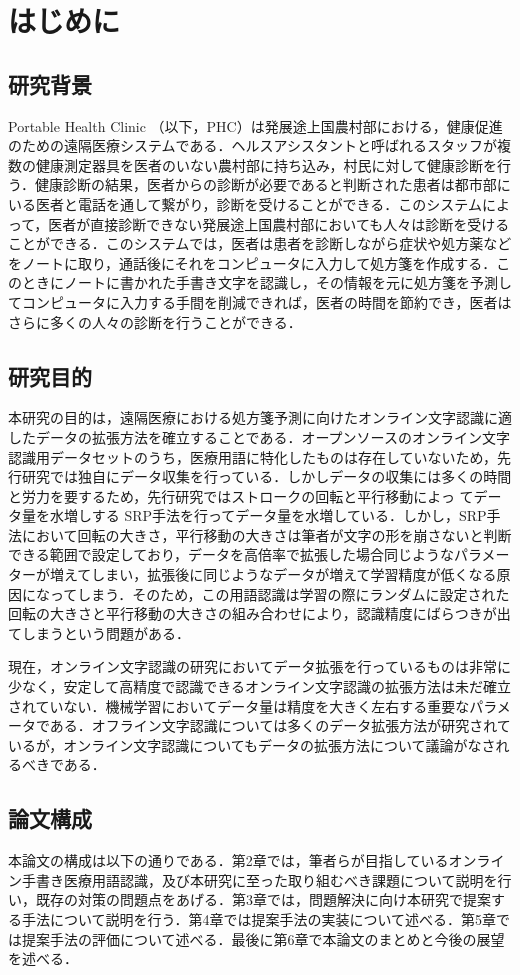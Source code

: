 
\chapter{はじめに}
\label{cha:intro}
\section{研究背景}
\label{sec:background}
Portable Health Clinic （以下，PHC）は発展途上国農村部における，健康促進のための遠隔医療システムである\cite{ahmed15:portable}．ヘルスアシスタントと呼ばれるスタッフが複数の健康測定器具を医者のいない農村部に持ち込み，村民に対して健康診断を行う．健康診断の結果，医者からの診断が必要であると判断された患者は都市部にいる医者と電話を通して繋がり，診断を受けることができる．このシステムによって，医者が直接診断できない発展途上国農村部においても人々は診断を受けることができる．このシステムでは，医者は患者を診断しながら症状や処方薬などをノートに取り，通話後にそれをコンピュータに入力して処方箋を作成する．このときにノートに書かれた手書き文字を認識し，その情報を元に処方箋を予測してコンピュータに入力する手間を削減できれば，医者の時間を節約でき，医者はさらに多くの人々の診断を行うことができる．

\section{研究目的}
本研究の目的は，遠隔医療における処方箋予測に向けたオンライン文字認識に適したデータの拡張方法を確立することである．オープンソースのオンライン文字認識用データセットのうち，医療用語に特化したものは存在していないため，先行研究\cite{takahashi}では独自にデータ収集を行っている．しかしデータの収集には多くの時間と労力を要するため，先行研究ではストロークの回転と平行移動によっ てデータ量を水増しする SRP手法を行ってデータ量を水増している．しかし，SRP手法において回転の大きさ，平行移動の大きさは筆者が文字の形を崩さないと判断できる範囲で設定しており，データを高倍率で拡張した場合同じようなパラメーターが増えてしまい，拡張後に同じようなデータが増えて学習精度が低くなる原因になってしまう．そのため，この用語認識は学習の際にランダムに設定された回転の大きさと平行移動の大きさの組み合わせにより，認識精度にばらつきが出てしまうという問題がある．

現在，オンライン文字認識の研究においてデータ拡張を行っているものは非常に少なく，安定して高精度で認識できるオンライン文字認識の拡張方法は未だ確立されていない．機械学習においてデータ量は精度を大きく左右する重要なパラメータである．オフライン文字認識については多くのデータ拡張方法が研究されているが，オンライン文字認識についてもデータの拡張方法について議論がなされるべきである．


\section{論文構成}
本論文の構成は以下の通りである．第2章では，筆者らが目指しているオンライン手書き医療用語認識，及び本研究に至った取り組むべき課題について説明を行い，既存の対策の問題点をあげる．第3章では，問題解決に向け本研究で提案する手法について説明を行う．第4章では提案手法の実装について述べる．第5章では提案手法の評価について述べる．最後に第6章で本論文のまとめと今後の展望を述べる．
